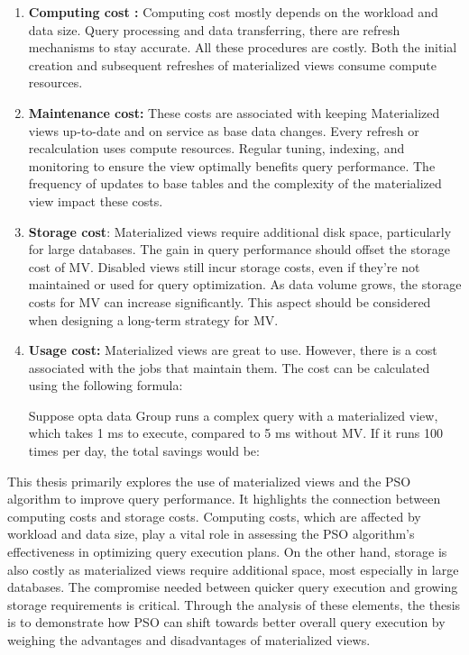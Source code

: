  \begin{enumerate}[label=\alph*)]
    \item \textbf{Computing cost :} Computing cost mostly depends on the workload and data size. Query processing and data transferring, there are refresh mechanisms to stay accurate. All these procedures are costly. Both the initial creation and subsequent refreshes of materialized views consume compute resources.
    
    \item \textbf{Maintenance cost:} These costs are associated with keeping Materialized views up-to-date and on service as base data changes. Every refresh or recalculation uses compute resources. Regular tuning, indexing, and monitoring to ensure the view optimally benefits query performance. The frequency of updates to base tables and the complexity of the materialized view impact these costs. 
    
    \item \textbf{Storage cost}: Materialized views require additional disk space, particularly for large databases. The gain in query performance should offset the storage cost of MV. Disabled views still incur storage costs, even if they're not maintained or used for query optimization. As data volume grows, the storage costs for MV can increase significantly. This aspect should be considered when designing a long-term strategy for MV. 
     
    \item \textbf{Usage cost:} Materialized views are great to use. However, there is a cost associated with the jobs that maintain them. The cost can be calculated using the following formula\cite{10.1145/2206869.2206874}:

    

  Suppose opta data Group runs a complex query with a materialized view, which takes 1 ms to execute, compared to 5 ms without MV. If it runs 100 times per day, the total savings would be:

  
  
\end{enumerate}

This thesis primarily explores the use of materialized views and the PSO algorithm to improve query performance. It highlights the connection between computing costs and storage costs. Computing costs, which are affected by workload and data size, play a vital role in assessing the PSO algorithm's effectiveness in optimizing query execution plans. On the other hand, storage is also costly as materialized views require additional space, most especially in large databases. The compromise needed between quicker query
execution and growing storage requirements is critical. Through the analysis of these elements, the thesis is to demonstrate how PSO can shift towards better overall query execution by weighing the advantages and disadvantages of materialized views.


